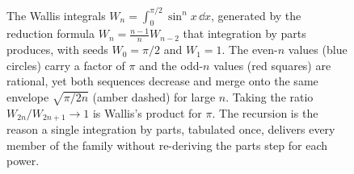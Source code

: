 \begin{figure}[htbp]
\centering
{}
\caption[Wallis integrals from the reduction formula]{The Wallis
integrals $W_{n} = \int_{0}^{\pi/2}\sin^{n}x\,\dd x$, generated by the
reduction formula $W_{n} = \tfrac{n-1}{n}W_{n-2}$ that integration by
parts produces, with seeds $W_{0} = \pi/2$ and $W_{1} = 1$. The even-$n$
values (blue circles) carry a factor of $\pi$ and the odd-$n$ values
(red squares) are rational, yet both sequences decrease and merge onto
the same envelope $\sqrt{\pi/2n}$ (amber dashed) for large $n$. Taking
the ratio $W_{2n}/W_{2n+1} \to 1$ is Wallis's product for $\pi$. The
recursion is the reason a single integration by parts, tabulated once,
delivers every member of the family without re-deriving the parts step
for each power.}
\label{fig:vol02ch06:wallis-reduction}
\end{figure}
